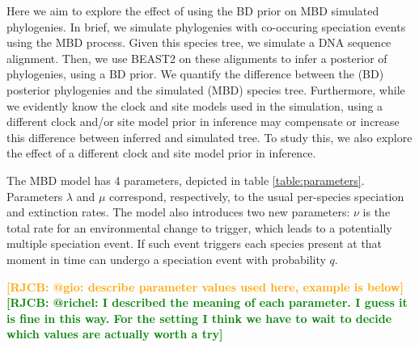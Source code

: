 \documentclass{article}
\newcommand*\richel[1]{\textcolor{orange}{\textbf{[RJCB: #1]}}}
\newcommand*\gio[1]{\textcolor{green}{\textbf{[RJCB: #1]}}}
\begin{document}
Here we aim to explore the effect of using the
BD prior on MBD simulated phylogenies.
In brief, we simulate phylogenies with co-occuring speciation events using the MBD process. 
Given this species tree, we simulate a DNA sequence alignment. Then, we use BEAST2 on these alignments
to infer a posterior of phylogenies, using a BD prior. We quantify the difference
between the (BD) posterior phylogenies and the simulated (MBD) species tree.
Furthermore, while we evidently know the clock and site models used in the simulation, 
using a different clock and/or site model prior in inference 
may compensate or increase this difference between inferred and simulated tree. 
To study this, we also explore the effect of 
a different clock and site model prior in inference.


The MBD model has 4 parameters, depicted in table \ref{table:parameters}. Parameters $\lambda$ and $\mu$ correspond, respectively, to the usual per-species speciation and extinction rates. The model also introduces two new parameters: $\nu$ is the total rate for an environmental change to trigger, which leads to a potentially multiple speciation event. If such event triggers each species present at that moment in time can undergo a speciation event with probability $q$.

\richel{@gio: describe parameter values used here, example is below}\gio{@richel: I described the meaning of each parameter. I guess it is fine in this way. For the setting I think we have to wait to decide which values are actually worth a try}
\end{document}

